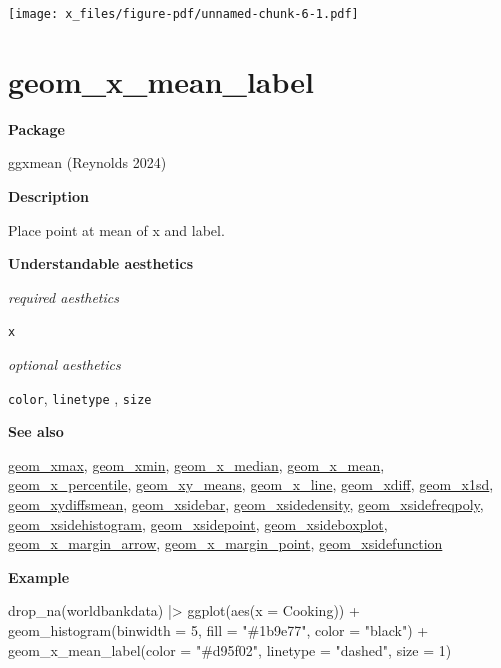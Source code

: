 \documentclass[
  letterpaper,
  DIV=11,
  numbers=noendperiod]{scrreprt}
\newenvironment{Shaded}{\begin{snugshade}}{\end{snugshade}}
\newcommand{\AttributeTok}[1]{\textcolor[rgb]{0.40,0.45,0.13}{#1}}
\newcommand{\DecValTok}[1]{\textcolor[rgb]{0.68,0.00,0.00}{#1}}
\newcommand{\FunctionTok}[1]{\textcolor[rgb]{0.28,0.35,0.67}{#1}}
\newcommand{\NormalTok}[1]{\textcolor[rgb]{0.00,0.23,0.31}{#1}}
\newcommand{\SpecialCharTok}[1]{\textcolor[rgb]{0.37,0.37,0.37}{#1}}
\newcommand{\StringTok}[1]{\textcolor[rgb]{0.13,0.47,0.30}{#1}}
\begin{document}
\texttt{[image: x\_files/figure-pdf/unnamed-chunk-6-1.pdf]}

\section{geom\_x\_mean\_label}\label{x_mean_label}

\textbf{Package}

ggxmean (Reynolds 2024)

\textbf{Description}

Place point at mean of x and label.

\textbf{Understandable aesthetics}

\emph{required aesthetics}

\texttt{x}

\emph{optional aesthetics}

\texttt{color}, \texttt{linetype} , \texttt{size}

\textbf{See also}

\href{@xmax}{geom\_xmax}, \href{@xmin}{geom\_xmin},
\href{@x_median}{geom\_x\_median}, \href{@x_mean}{geom\_x\_mean},
\href{@x_percentile}{geom\_x\_percentile},
\href{@xy_means}{geom\_xy\_means}, \href{@x_line}{geom\_x\_line},
\href{@xdiff}{geom\_xdiff}, \href{@x1sd}{geom\_x1sd},
\href{@xydiffsmean}{geom\_xydiffsmean},
\href{@xsidebar}{geom\_xsidebar},
\href{@xsidedensity}{geom\_xsidedensity},
\href{@xsidefreqpoly}{geom\_xsidefreqpoly},
\href{@xsidehistogram}{geom\_xsidehistogram},
\href{@xsidepoint}{geom\_xsidepoint},
\href{@xsideboxplot}{geom\_xsideboxplot},
\href{@x_margin_arrow}{geom\_x\_margin\_arrow},
\href{@x_margin_point}{geom\_x\_margin\_point},
\href{@xsidefunction}{geom\_xsidefunction}

\textbf{Example}

\begin{Shaded}
\begin{Highlighting}[]
\FunctionTok{drop\_na}\NormalTok{(worldbankdata) }\SpecialCharTok{|\textgreater{}}
\FunctionTok{ggplot}\NormalTok{(}\FunctionTok{aes}\NormalTok{(}\AttributeTok{x =}\NormalTok{ Cooking)) }\SpecialCharTok{+}
  \FunctionTok{geom\_histogram}\NormalTok{(}\AttributeTok{binwidth =} \DecValTok{5}\NormalTok{, }\AttributeTok{fill =} \StringTok{"\#1b9e77"}\NormalTok{, }\AttributeTok{color =} \StringTok{"black"}\NormalTok{) }\SpecialCharTok{+} 
  \FunctionTok{geom\_x\_mean\_label}\NormalTok{(}\AttributeTok{color =} \StringTok{"\#d95f02"}\NormalTok{, }\AttributeTok{linetype =} \StringTok{"dashed"}\NormalTok{, }\AttributeTok{size =} \DecValTok{1}\NormalTok{) }
\end{Highlighting}
\end{Shaded}
\end{document}
